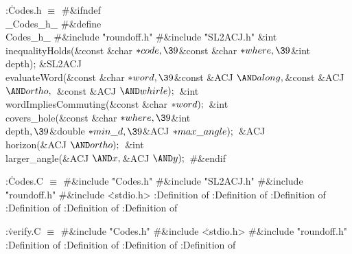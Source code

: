 \B{}:\.{Codes.h }\X${}\equiv{}$\6
\8\#\&{ifndef} \\{\_Codes\_h\_}\6
\8\#\&{define} \\{Codes\_h\_}\6
\8\#\&{include} \.{"roundoff.h"}\6
\8\#\&{include} \.{"SL2ACJ.h"}\6
\&{int} \\{inequalityHolds}(\&{const} \&{char} ${}{*}\\{code},\39{}$\&{const} %
\&{char} ${}{*}\\{where},\39{}$\&{int} \\{depth});\6
\&{SL2ACJ} \\{evaluateWord}(\&{const} \&{char} ${}{*}\\{word},\39{}$\&{const} %
\&{ACJ} ${}{\AND}\\{along},\39{}$\&{const} \&{ACJ} ${}{\AND}\\{ortho},\39{}$%
\&{const} \&{ACJ} ${}{\AND}\\{whirle});{}$\6
\&{int} \\{wordImpliesCommuting}(\&{const} \&{char} ${}{*}\\{word});{}$\6
\&{int} \\{covers\_hole}(\&{const} \&{char} ${}{*}\\{where},\39{}$\&{int} %
\\{depth}${},\39{}$\&{double} ${}{*}\\{min\_d},\39{}$\&{ACJ} ${}{*}\\{max%
\_angle});{}$\6
\&{ACJ} \\{horizon}(\&{ACJ} ${}{\AND}\\{ortho});{}$\6
\&{int} \\{larger\_angle}(\&{ACJ} ${}{\AND}\|x,\39{}$\&{ACJ} ${}{\AND}\|y);{}$\6
\8\#\&{endif}\par
\fi

\B{}:\.{Codes.C }\X${}\equiv{}$\6
\8\#\&{include} \.{"Codes.h"}\6
\8\#\&{include} \.{"SL2ACJ.h"}\6
\8\#\&{include} \.{"roundoff.h"}\6
\8\#\&{include} \.{<stdio.h>}\6
:Definition of \X\6
:Definition of \X\6
:Definition of \X\6
:Definition of \X\6
:Definition of \X\6
:Definition of \X\par
\fi

\B{}:\.{verify.C }\X${}\equiv{}$\6
\8\#\&{include} \.{"Codes.h"}\6
\8\#\&{include} \.{<stdio.h>}\6
\8\#\&{include} \.{"roundoff.h"}\6
:Definition of \X\6
:Definition of \X\6
:Definition of \X\6
:Definition of \X\par
\fi


\inx
\fin
\con
